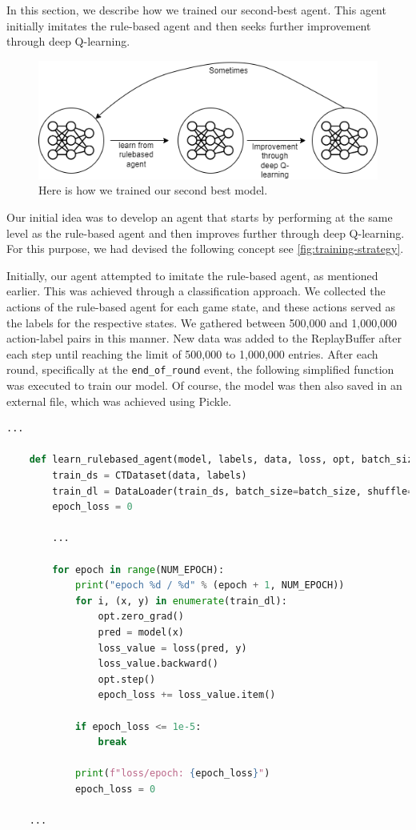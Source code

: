 In this section, we describe how we trained our second-best agent. This agent initially imitates 
the rule-based agent and then seeks further improvement through deep Q-learning.

\begin{figure}[H]
    \centering
    
    \includegraphics[width=\oneImgWidth]{images/training-strategy}%
    
    \captionadjust%
    \caption{\label{fig:training-strategy} Here is how we trained our second best model.
    }%
\end{figure}

Our initial idea was to develop an agent that starts by performing at the same level as the rule-based agent and then improves 
further through deep Q-learning. For this purpose, we had devised the following concept see \autoref{fig:training-strategy}.

Initially, our agent attempted to imitate the rule-based agent, as mentioned earlier. This was achieved through a classification approach. 
We collected the actions of the rule-based agent for each game state, and these actions served as the labels for the respective states. 
We gathered between 500,000 and 1,000,000 action-label pairs in this manner.
New data was added to the ReplayBuffer after each step until reaching the limit of 500,000 to 1,000,000 entries. 
After each round, specifically at the \verb|end_of_round| event, the following simplified function was executed to train our model.
Of course, the model was then also saved in an external file, which was achieved using Pickle.

\begin{lstlisting}[language=Python]
    ...
    
    def learn_rulebased_agent(model, labels, data, loss, opt, batch_size):
        train_ds = CTDataset(data, labels)
        train_dl = DataLoader(train_ds, batch_size=batch_size, shuffle=True)
        epoch_loss = 0

        ...

        for epoch in range(NUM_EPOCH):
            print("epoch %d / %d" % (epoch + 1, NUM_EPOCH))
            for i, (x, y) in enumerate(train_dl):
                opt.zero_grad()
                pred = model(x)
                loss_value = loss(pred, y) 
                loss_value.backward() 
                opt.step()
                epoch_loss += loss_value.item() 

            if epoch_loss <= 1e-5:
                break

            print(f"loss/epoch: {epoch_loss}")
            epoch_loss = 0      

    ...
    
\end{lstlisting}

